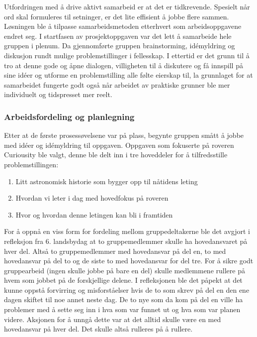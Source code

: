 Utfordringen med å drive aktivt samarbeid er at det er tidkrevende.
Spesielt når ord skal formuleres til setninger, er det lite effisient å jobbe flere sammen.
Løsningen ble å tilpasse samarbeidsmetoden etterhvert som arbeidsoppgavene endret seg.
I startfasen av prosjektoppgaven var det lett å samarbeide hele gruppen i plenum.
Da gjennomførte gruppen brainstorming, id\'{e}myldring og diskusjon rundt mulige problemstillinger i fellesskap.
I ettertid er det grunn til å tro at denne gode og åpne dialogen, villigheten til å diskutere og få innspill på sine id\'{e}er og utforme en problemstilling alle følte eierskap til, la grunnlaget for at samarbeidet fungerte godt også når arbeidet av praktiske grunner ble mer individuelt og tidspresset mer reelt.\\

\subsubsection{Arbeidsfordeling og planlegning}
Etter at de første prosessøvelsene var på plass, begynte gruppen smått å jobbe med id\'{e}er og id\'{e}myldring til oppgaven.
Oppgaven som fokuserte på roveren Curiousity ble valgt, denne ble delt inn i tre hoveddeler for å tilfredsstille problemstillingen:
\begin{enumerate}
\item Litt astronomisk historie som bygger opp til nåtidens leting
\item Hvordan vi leter i dag med hovedfokus på roveren
\item Hvor og hvordan denne letingen kan bli i framtiden
\end{enumerate}
For å oppnå en viss form for fordeling mellom gruppedeltakerne ble det avgjort i refleksjon fra 6. landsbydag at to gruppemedlemmer skulle ha hovedansvaret på hver del.
Altså to gruppemedlemmer med hovedansvar på del en, to med hovedansvar på del to og de siste to med hovedansvar for del tre.
For å sikre godt gruppearbeid (ingen skulle jobbe på bare en del) skulle medlemmene rullere på hvem som jobbet på de forskjellige delene.
I refleksjonen ble det påpekt at det kunne oppstå forvirring og misforståelser hvis de to som skrev på del en den ene dagen skiftet til noe annet neste dag.
De to nye som da kom på del en ville ha problemer med å sette seg inn i hva som var funnet ut og hva som var planen videre.
Aksjonen for å unngå dette var at det alltid skulle være en med hovedansvar på hver del.
Det skulle altså rulleres på å rullere.\\

